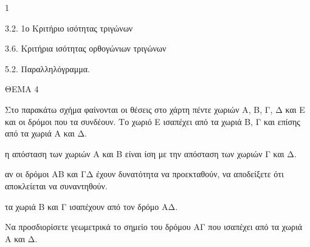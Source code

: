 \begin{ylh}{1}
    \item 3.2. 1ο Κριτήριο ισότητας τριγώνων
    \item 3.6. Κριτήρια ισότητας ορθογώνιων τριγώνων
    \item 5.2. Παραλληλόγραμμα.
\end{ylh}

ΘΕΜΑ 4

Στο παρακάτω σχήμα φαίνονται οι θέσεις στο χάρτη πέντε χωριών Α, Β, Γ, Δ και Ε και οι δρόμοι που τα συνδέουν. Το χωριό Ε ισαπέχει από τα χωριά Β, Γ και επίσης από τα χωριά Α και Δ.

\begin{alist}
\item Να αποδείξετε ότι:

.}
\end{alist}
\begin{alist}
\item
  η απόσταση των χωριών Α και Β είναι ίση με την απόσταση των χωριών Γ και Δ. 
\item
  αν οι δρόμοι ΑΒ και ΓΔ έχουν δυνατότητα να προεκταθούν, να αποδείξετε ότι αποκλείεται να συναντηθούν. 
\item
  τα χωριά Β και Γ ισαπέχουν από τον δρόμο ΑΔ. 

\item Να προσδιορίσετε γεωμετρικά το σημείο του δρόμου ΑΓ που ισαπέχει από τα χωριά Α και Δ. 


\end{alist}
